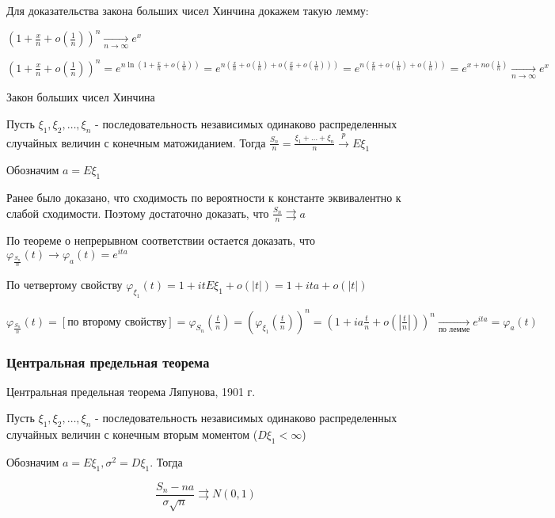 \documentclass[12pt]{article}
\begin{document}
Для доказательства закона больших чисел Хинчина докажем такую лемму: 

$\left(1 + \frac{x}{n} + o\left(\frac{1}{n}\right)\right)^n \underset{n \to \infty}{\longrightarrow} e^x$

\begin{MyProof}
    $\left(1 + \frac{x}{n} + o\left(\frac{1}{n}\right)\right)^n = e^{n \ln\left(1 + \frac{x}{n} + o\left(\frac{1}{n}\right)\right)} = 
    e^{n \left(\frac{x}{n} + o\left(\frac{1}{n}\right) + o\left(\frac{x}{n} + o\left(\frac{1}{n}\right)\right)\right)} = e^{n\left(\frac{x}{n} + o\left(\frac{1}{n}\right) + o\left(\frac{1}{n}\right)\right)} = e^{x + n o\left(\frac{1}{n}\right)} \underset{n \to \infty}{\longrightarrow} e^x$
\end{MyProof}

\begin{MyTheorem}
    \Ths Закон больших чисел Хинчина

    Пусть $\xi_1, \xi_2, \dots, \xi_n$ - последовательность независимых одинаково распределенных случайных величин с конечным матожиданием.
    Тогда $\frac{S_n}{n} = \frac{\xi_1 + \dots + \xi_n}{n} \overset{p}{\longrightarrow} E\xi_1$
\end{MyTheorem}

\begin{MyProof}
    Обозначим $a = E\xi_1$

    Ранее было доказано, что сходимость по вероятности к константе эквивалентно к слабой сходимости. Поэтому достаточно доказать, что $\frac{S_n}{n} \rightrightarrows a$

    По теореме о непрерывном соответствии остается доказать, что $\varphi_{\frac{S_n}{n}}(t) \longrightarrow \varphi_a(t) = e^{ita}$

    По четвертому свойству $\varphi_{\xi_1}(t) = 1 + itE\xi_1 + o(|t|) = 1 + ita + o(|t|)$

    $\varphi_{\frac{S_n}{n}}(t) = [\text{по второму свойству}] = \varphi_{S_n}\left(\frac{t}{n}\right) = \left(\varphi_{\xi_1}\left(\frac{t}{n}\right)\right)^n = \left(1 + ia\frac{t}{n} + o\left(\left|\frac{t}{n}\right|\right)\right)^n \underset{\text{по лемме}}{\longrightarrow}
    e^{ita} = \varphi_a(t)$
\end{MyProof}

\subsubsection{Центральная предельная теорема}

\begin{MyTheorem}
    \Ths Центральная предельная теорема Ляпунова, 1901 г.

    Пусть $\xi_1, \xi_2, \dots, \xi_n$ - последовательность независимых одинаково распределенных случайных величин с конечным вторым моментом ($D\xi_1 < \infty$)

    Обозначим $a = E\xi_1, \sigma^2 = D\xi_1$. Тогда 

    \[\frac{S_n - na}{\sigma\sqrt{n}} \rightrightarrows N(0, 1)\]
\end{MyTheorem}
\end{document}
